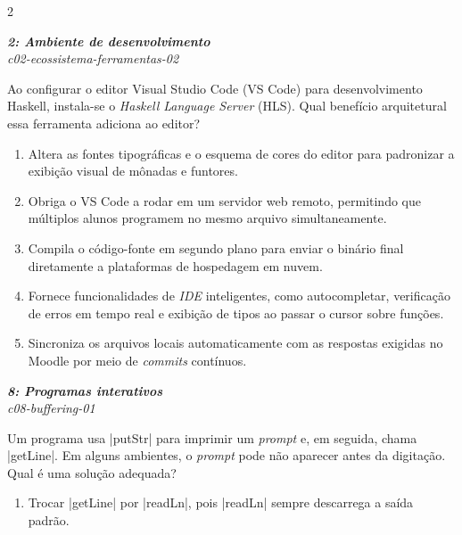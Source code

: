 \documentclass[a4paper,10pt,brazil]{article}
\begin{document}
\begin{multicols}{2}
\begin{flushright}
  \footnotesize
  \textit{\textbf{2: Ambiente de desenvolvimento}}\\
  \textit{c02-ecossistema-ferramentas-02}\\

\end{flushright}
Ao configurar o editor Visual Studio Code (VS Code) para desenvolvimento Haskell, instala-se o \emph{Haskell Language Server} (HLS). Qual benefício arquitetural essa ferramenta adiciona ao editor?

\begin{enumerate}
  \item Altera as fontes tipográficas e o esquema de cores do editor para padronizar a exibição visual de mônadas e funtores.

  \item Obriga o VS Code a rodar em um servidor web remoto, permitindo que múltiplos alunos programem no mesmo arquivo simultaneamente.

  \item Compila o código-fonte em segundo plano para enviar o binário final diretamente a plataformas de hospedagem em nuvem.

  \item Fornece funcionalidades de \emph{IDE} inteligentes, como autocompletar, verificação de erros em tempo real e exibição de tipos ao passar o cursor sobre funções.

  \item Sincroniza os arquivos locais automaticamente com as respostas exigidas no Moodle por meio de \emph{commits} contínuos.


\end{enumerate}

\begin{flushright}
  \footnotesize
  \textit{\textbf{8: Programas interativos}}\\
  \textit{c08-buffering-01}\\

\end{flushright}
Um programa usa \haskellinline|putStr| para imprimir um \emph{prompt} e, em seguida, chama \haskellinline|getLine|. Em alguns ambientes, o \emph{prompt} pode não aparecer antes da digitação. Qual é uma solução adequada?

\begin{enumerate}
  \item Trocar \haskellinline|getLine| por \haskellinline|readLn|, pois \haskellinline|readLn| sempre descarrega a saída padrão.


\end{enumerate}
\end{multicols}
\end{document}
